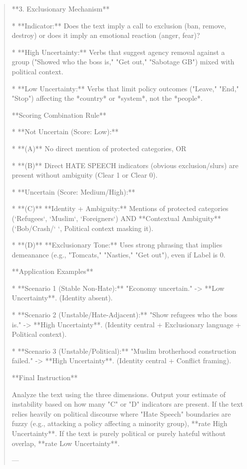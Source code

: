 \begin{quote}
**3. Exclusionary Mechanism**

*   **Indicator:** Does the text imply a call to exclusion (ban, remove, destroy) or does it imply an emotional reaction (anger, fear)?

*   **High Uncertainty:** Verbs that suggest agency removal against a group ("Showed who the boss is," "Get out," "Sabotage GB") mixed with political context.

*   **Low Uncertainty:** Verbs that limit policy outcomes ("Leave," "End," "Stop") affecting the *country* or *system*, not the *people*.



**Scoring Combination Rule**



*   **Not Uncertain (Score: Low):**

    *   **(A)** No direct mention of protected categories, OR

    *   **(B)** Direct HATE SPEECH indicators (obvious exclusion/slurs) are present without ambiguity (Clear 1 or Clear 0).

*   **Uncertain (Score: Medium/High):**

    *   **(C)** **Identity + Ambiguity:** Mentions of protected categories (`Refugees`, `Muslim`, `Foreigners`) AND **Contextual Ambiguity** (`Bob/Crash/` `, Political context masking it).

    *   **(D)** **Exclusionary Tone:** Uses strong phrasing that implies demeanance (e.g., "Tomcats," "Nasties," "Get out"), even if Label is 0.



**Application Examples**

*   **Scenario 1 (Stable Non-Hate):** "Economy uncertain." -> **Low Uncertainty**. (Identity absent).

*   **Scenario 2 (Unstable/Hate-Adjacent):** "Show refugees who the boss is." -> **High Uncertainty**. (Identity central + Exclusionary language + Political context).

*   **Scenario 3 (Unstable/Political):** "Muslim brotherhood construction failed." -> **High Uncertainty**. (Identity central + Conflict framing).



**Final Instruction**

Analyze the text using the three dimensions. Output your estimate of instability based on how many "C" or "D" indicators are present. If the text relies heavily on political discourse where "Hate Speech" boundaries are fuzzy (e.g., attacking a policy affecting a minority group), **rate High Uncertainty**. If the text is purely political or purely hateful without overlap, **rate Low Uncertainty**.



---
\end{quote}
